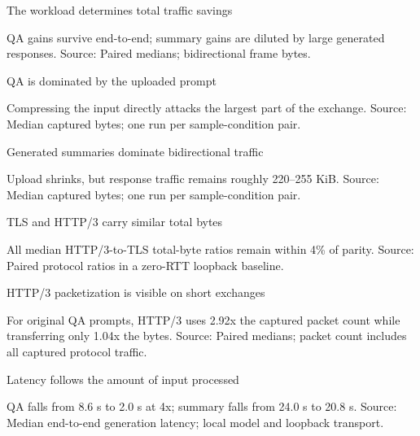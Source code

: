 \documentclass[aspectratio=169,10pt]{beamer}
\newcommand{\source}[1]{\vfill{\tiny\color{gray}Source: #1}}
\begin{document}
\begin{frame}{The workload determines total traffic savings}
  \centering
  \PlotTotalReduction
  \vspace{-0.15cm}

  \small QA gains survive end-to-end; summary gains are diluted by large generated responses.
  \source{Paired medians; bidirectional frame bytes.}
\end{frame}

\begin{frame}{QA is dominated by the uploaded prompt}
  \centering
  \PlotDirectionQA
  \vspace{-0.15cm}

  \small Compressing the input directly attacks the largest part of the exchange.
  \source{Median captured bytes; one run per sample-condition pair.}
\end{frame}

\begin{frame}{Generated summaries dominate bidirectional traffic}
  \centering
  \PlotDirectionSummary
  \vspace{-0.15cm}

  \small Upload shrinks, but response traffic remains roughly 220--255 KiB.
  \source{Median captured bytes; one run per sample-condition pair.}
\end{frame}

\begin{frame}{TLS and HTTP/3 carry similar total bytes}
  \centering
  \PlotProtocolBytes
  \vspace{-0.15cm}

  \small All median HTTP/3-to-TLS total-byte ratios remain within 4\% of parity.
  \source{Paired protocol ratios in a zero-RTT loopback baseline.}
\end{frame}

\begin{frame}{HTTP/3 packetization is visible on short exchanges}
  \centering
  \PlotProtocolPackets
  \vspace{-0.15cm}

  \small For original QA prompts, HTTP/3 uses 2.92x the captured packet count while transferring only 1.04x the bytes.
  \source{Paired medians; packet count includes all captured protocol traffic.}
\end{frame}

\begin{frame}{Latency follows the amount of input processed}
  \centering
  \PlotLatencyMedians
  \vspace{-0.15cm}

  \small QA falls from 8.6 s to 2.0 s at 4x; summary falls from 24.0 s to 20.8 s.
  \source{Median end-to-end generation latency; local model and loopback transport.}
\end{frame}
\end{document}
